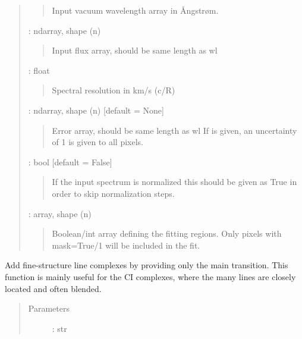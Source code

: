 \documentclass[letterpaper,10pt,english]{sphinxmanual}
\begin{document}
\begin{fulllineitems}
\begin{fulllineitems}
\begin{quote}
\begin{description}
\begin{quote}
Input vacuum wavelength array in Ångstrøm.
\end{quote}

 : ndarray, shape (n)
\begin{quote}

Input flux array, should be same length as wl
\end{quote}

 : float
\begin{quote}

Spectral resolution in km/s  (c/R)
\end{quote}

 : ndarray, shape (n)   {[}default = None{]}
\begin{quote}

Error array, should be same length as wl
If  is given, an uncertainty of 1 is given to all pixels.
\end{quote}

 : bool   {[}default = False{]}
\begin{quote}

If the input spectrum is normalized this should be given as True
in order to skip normalization steps.
\end{quote}

 : array, shape (n)
\begin{quote}

Boolean/int array defining the fitting regions.
Only pixels with mask=True/1 will be included in the fit.
\end{quote}

\end{description}\end{quote}

\end{fulllineitems}


\begin{fulllineitems}
\label{\detokenize{api:VoigtFit.DataSet.add_fine_lines}}
Add fine-structure line complexes by providing only the main transition.
This function is mainly useful for the CI complexes, where the many lines are closely
located and often blended.
\begin{quote}\begin{description}
\item[{Parameters}] \leavevmode
{} : str
\begin{quote}


\end{quote}
\end{description}
\end{quote}
\end{fulllineitems}
\end{fulllineitems}
\end{document}
